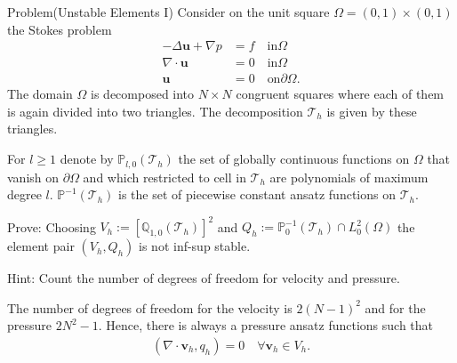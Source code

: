 \begin {blocktheorem}{Problem}(Unstable Elements I)
Consider on the unit square $\Omega=(0, 1) \times (0, 1)$ the Stokes problem
\begin{align*}
  -\Delta \boldsymbol{u} + \nabla p &= f \quad \text {in} \Omega\\
  \nabla \cdot \boldsymbol{u}       &= 0 \quad \text {in} \Omega\\
                     \boldsymbol{u} &= 0 \quad \text {on} \partial\Omega.
\end{align*}
The domain $\Omega$ is decomposed into $N \times N$ congruent squares where each
of them is again divided into two triangles. The decomposition $\mathcal{T}_h$
is given by these triangles.

For $l \geq 1$ denote by $\mathbb{P}_{l,0}(\mathcal{T}_h)$ the set of globally
continuous functions on $\Omega$ that vanish on $\partial\Omega$ and which
restricted to cell in $\mathcal{T}_h$ are polynomials of maximum degree $l$.
$\mathbb{P}^{-1}(\mathcal{T}_h)$ is the set of piecewise
constant ansatz functions on $\mathcal{T}_h$.

Prove: Choosing $V_h:= [\mathbb{Q}_{1,0}(\mathcal{T}_h)]^2$ and
 $Q_h:=\mathbb{P}_0^{-1}(\mathcal{T}_h)\cap L_0^2(\Omega)$ the element pair
 $(V_h, Q_h)$ is not inf-sup stable.

Hint: Count the number of degrees of freedom for velocity and pressure.

\begin{solution}
The number of degrees of freedom for the velocity is $2(N-1)^2$ and for the
pressure $2N^2-1$. Hence, there is always a pressure ansatz functions such that
\begin{align*}
 (\nabla \cdot \boldsymbol{v}_h, q_h)=0 \quad \forall \boldsymbol{v}_h\in V_h.
\end{align*}
\end{solution}
\end{blocktheorem}
